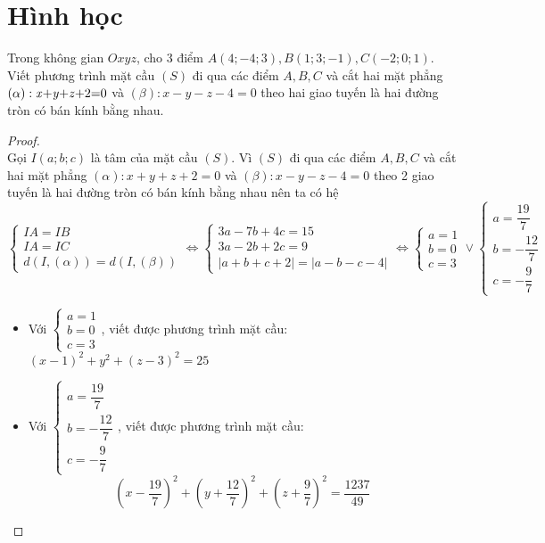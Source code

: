 \section{Hình học}
\begin{dl}
	Trong không gian $Oxyz$, cho 3 điểm $A(4;-4;3), B(1;3;-1), C(-2;0;1)$. Viết phương trình mặt cầu $(S)$ đi qua các điểm $A, B, C$ và cắt hai mặt phẳng $(\alpha): \mbox{\textit{x}+\textit{y}+\textit{z}+2=0}$ và $(\beta): x-y-z-4=0$ theo hai giao tuyến là hai đường tròn có bán kính bằng nhau.
\end{dl}
\begin{proof}~\\[8pt]
	Gọi $I(a;b;c)$ là tâm của mặt cầu $(S)$.
	Vì $(S)$ đi qua các điểm $A, B, C$ và cắt hai mặt phẳng $(\alpha): x+y+z+2=0$ và $(\beta): x-y-z-4=0$ theo 2 giao tuyến là hai đường tròn có bán kính bằng nhau nên ta có hệ
	$$\begin{cases}
	IA=IB\\
	IA=IC\\
	d(I,(\alpha))=d(I,(\beta))
	\end{cases}\Leftrightarrow
	\begin{cases}
	3a-7b+4c=15\\
	3a-2b+2c=9\\
	|a+b+c+2|=|a-b-c-4|
	\end{cases}
	\Leftrightarrow \begin{cases}
	a=1\\b=0\\c=3
	\end{cases}\vee \begin{cases}
	a=\dfrac{19}{7}\\[10pt]
	b=-\dfrac{12}{7}\\[10pt]
	c=-\dfrac{9}{7}
	\end{cases}$$
	\begin{itemize}
		\item Với $\begin{cases}
			a=1\\b=0\\c=3
		\end{cases}$, viết được phương trình mặt cầu: $(x-1)^2+y^2+(z-3)^2=25$


	\item  Với $\begin{cases}
	a=\dfrac{19}{7}\\[10pt]
	b=-\dfrac{12}{7}\\[10pt]
	c=-\dfrac{9}{7}
	\end{cases}$, viết được phương trình mặt cầu: $$\left(x-\frac{19}{7}\right)^2+ \left(y+\frac{12}{7}\right)^2+ \left(z+\frac{9}{7}\right)^2=\frac{1237}{49}$$
	\end{itemize}
\end{proof}

